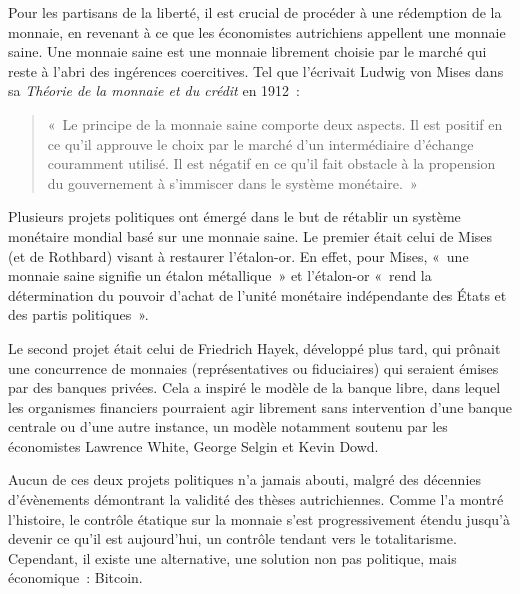 
Pour les partisans de la liberté, il est crucial de procéder à une rédemption de la monnaie, en revenant à ce que les économistes autrichiens appellent une monnaie saine. Une monnaie saine est une monnaie librement choisie par le marché qui reste à l'abri des ingérences coercitives. Tel que l'écrivait Ludwig von Mises dans sa \emph{Théorie de la monnaie et du crédit} en 1912~:

\begin{quote}
«~Le principe de la monnaie saine comporte deux aspects. Il est positif en ce qu'il approuve le choix par le marché d'un intermédiaire d'échange couramment utilisé. Il est négatif en ce qu'il fait obstacle à la propension du gouvernement à s'immiscer dans le système monétaire.~»
\end{quote}

Plusieurs projets politiques ont émergé dans le but de rétablir un système monétaire mondial basé sur une monnaie saine. Le premier était celui de Mises (et de Rothbard) visant à restaurer l'étalon-or. En effet, pour Mises, «~une monnaie saine signifie un étalon métallique~» et l'étalon-or «~rend la détermination du pouvoir d'achat de l'unité monétaire indépendante des États et des partis politiques~».

Le second projet était celui de Friedrich Hayek, développé plus tard, qui prônait une concurrence de monnaies (représentatives ou fiduciaires) qui seraient émises par des banques privées. Cela a inspiré le modèle de la banque libre, dans lequel les organismes financiers pourraient agir librement sans intervention d'une banque centrale ou d'une autre instance, un modèle notamment soutenu par les économistes Lawrence White, George Selgin et Kevin Dowd.

Aucun de ces deux projets politiques n'a jamais abouti, malgré des décennies d'évènements démontrant la validité des thèses autrichiennes. Comme l'a montré l'histoire, le contrôle étatique sur la monnaie s'est progressivement étendu jusqu'à devenir ce qu'il est aujourd'hui, un contrôle tendant vers le totalitarisme. Cependant, il existe une alternative, une solution non pas politique, mais économique~: Bitcoin.

